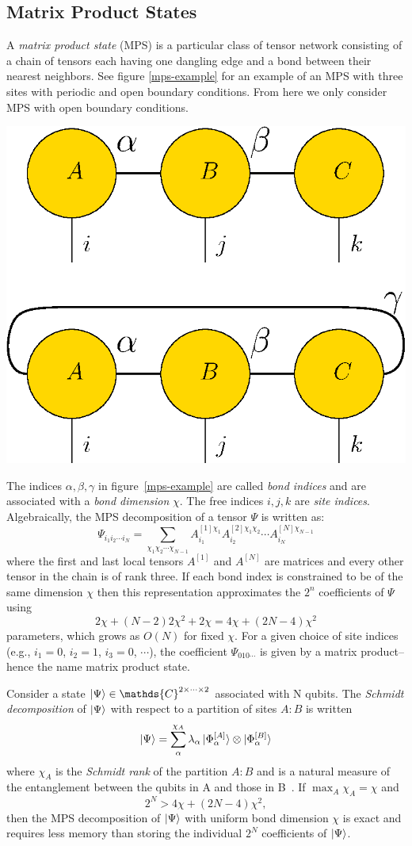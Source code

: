 \documentclass[12pt]{article}
\newenvironment{Figure}
  {\par\medskip\noindent\minipage{\linewidth}}
  {\endminipage\par\medskip}
\begin{document}
\begin{multicols}{2}
\section{Matrix Product States}
	A \textit{matrix product state} (MPS) is a particular class
	of
	tensor network consisting of a chain of tensors each having one
	dangling edge and a bond between their nearest neighbors. See figure
	\ref{mps-example} for an example of an MPS with three sites with
	periodic and open boundary conditions. From here we only
	consider MPS with open boundary conditions.
	\begin{Figure}
		\center\includegraphics[width=.55\textwidth]{./Figures/mps-example.eps}
		\label{mps-example}
	\end{Figure}
	The indices $\alpha,\beta,\gamma$ in figure~\ref{mps-example} are called
	\textit{bond indices} and are associated with a
	\textit{bond dimension} $\chi$. The free indices $i,j,k$ are
	\textit{site indices}. Algebraically, the MPS decomposition of a tensor $\Psi$ is written as:
	$$\Psi_{i_1i_2\cdots i_N}=\sum_{\chi_1\chi_2\cdots\chi_{N-1}}A^{[1]\chi_1}_{i_1}A_{i_2}^{[2]\chi_1\chi_2}\cdots A^{[N]\chi_{N-1}}_{i_N}$$
	where the first and last local tensors $A^{[1]}$ and $A^{[N]}$ are
	matrices and every other tensor in the chain is of rank three. If
	each bond index is constrained to be of the same dimension $\chi$ then
	this representation approximates the $2^n$ coefficients of $\Psi$ using
	$$2\chi+(N-2)2\chi^2+2\chi=4\chi+(2N-4)\chi^2$$
	parameters, which grows as $O(N)$ for fixed $\chi$.
	For a given choice of site indices (e.g., $i_1=0$, $i_2=1$, $i_3=0$,
	$\cdots$), the coefficient $\Psi_{010\cdots}$ is given by a matrix
	product-- hence the name matrix product state.

	Consider a state $\ket{\Psi}\in\mathds{C}^{2\times\cdots\times2}$
	associated with N qubits.
	The \textit{Schmidt decomposition} of $\ket{\Psi}$ with respect to a
	partition of sites $A:B$ is written
	$$\ket{\Psi}=\sum_\alpha^{\chi_A}\lambda_\alpha\ket{\Phi_\alpha^{[A]}}\otimes\ket{\Phi_\alpha^{[B]}}$$
	where $\chi_A$ is the \textit{Schmidt rank} of the partition $A:B$
	and is a natural measure of the entanglement between the qubits in A
	and those in B~\cite{Vidal}. If $\max_A\chi_A=\chi$ and
	$$2^N>4\chi+(2N-4)\chi^2,$$
	then the MPS decomposition of $\ket{\Psi}$ with uniform bond
	dimension $\chi$ is exact and requires less memory than storing the
	individual $2^N$ coefficients of $\ket{\Psi}$.


\end{multicols}
\end{document}
